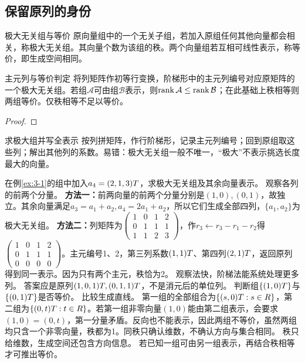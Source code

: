 \subsection{保留原列的身份}
\begin{definition}{极大无关组与等价}
原向量组中的一个无关子组，若加入原组任何其他向量都会相关，称极大无关组。其向量个数为该组的秩。两个向量组若互相可线性表示，称等价，即生成空间相同。
\end{definition}
\begin{theorem}{主元列与等价判定}
将列矩阵作初等行变换，阶梯形中的主元列编号对应原矩阵的一个极大无关组。若组$\mathcal A$可由组$\mathcal B$表示，则$\operatorname{rank}\mathcal A\le\operatorname{rank}\mathcal B$；在此基础上秩相等则两组等价。仅秩相等不足以等价。
\end{theorem}
\begin{proof}

\end{proof}
\begin{method}{求极大组并写全表示}
按列拼矩阵，作行阶梯形，记录主元列编号；回到原组取这些列；解出其他列的系数。易错：极大无关组一般不唯一，“极大”不表示挑选长度最大的向量。
\end{method}
{在例\ref{ex:3-1}的组中加入$a_4=(2,1,3)T$，求极大无关组及其余向量表示。}
{观察各列的前两个分量。}
{\textbf{方法一：}前两向量的前两个分量分别是$(1,0),(0,1)$，故独立。其余向量满足$a_3=a_1+a_2,a_4=2a_1+a_2$，所以它们生成全部四列，$\{a_1,a_2\}$为极大无关组。
\textbf{方法二：}列矩阵为$\begin{pmatrix}1&0&1&2\\0&1&1&1\\1&1&2&3\end{pmatrix}$，作$r_3\leftarrow r_3-r_1-r_2$得$\begin{pmatrix}1&0&1&2\\0&1&1&1\\0&0&0&0\end{pmatrix}$。主元编号1、2，第三列系数$(1,1)T$、第四列$(2,1)T$，返回原列得到同一表示。因为只有两个主元，秩恰为2。}
{观察法快，阶梯法能系统处理更多列。}
{答案应是原列$(1,0,1)T,(0,1,1)T$，不是消元后的单位列。}
{判断组$\{(1,0)T\}$与$\{(0,1)T\}$是否等价。}
{比较生成直线。}
{第一组的全部组合为$\{(s,0)T:s\in R\}$，第二组为$\{(0,t)T:t\in R\}$。若第一组非零向量$(1,0)$能由第二组表示，会要求$(1,0)=(0,t)$，第一分量矛盾。反向也不能表示，因此两组不等价，虽然两组均只含一个非零向量，秩都为1。同秩只确认维数，不确认方向与集合相同。}
{秩只给维数，生成空间还包含方向信息。}
{若已知一组可由另一组表示，再结合秩相等才可推出等价。}
